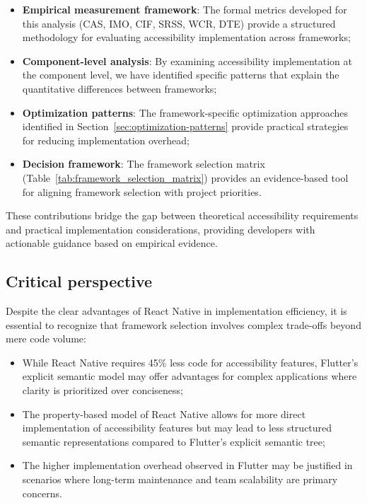 \begin{itemize}
    \item \textbf{Empirical measurement framework}: The formal metrics developed for this analysis (CAS, IMO, CIF, SRSS, WCR, DTE) provide a structured methodology for evaluating accessibility implementation across frameworks;

    \item \textbf{Component-level analysis}: By examining accessibility implementation at the component level, we have identified specific patterns that explain the quantitative differences between frameworks;

    \item \textbf{Optimization patterns}: The framework-specific optimization approaches identified in Section~\ref{sec:optimization-patterns} provide practical strategies for reducing implementation overhead;

    \item \textbf{Decision framework}: The framework selection matrix (Table~\ref{tab:framework_selection_matrix}) provides an evidence-based tool for aligning framework selection with project priorities.
\end{itemize}

These contributions bridge the gap between theoretical accessibility requirements and practical implementation considerations, providing developers with actionable guidance based on empirical evidence.

\subsection{Critical perspective}
\label{subsec:conclusion-critical}

Despite the clear advantages of React Native in implementation efficiency, it is essential to recognize that framework selection involves complex trade-offs beyond mere code volume:

\begin{itemize}
    \item While React Native requires 45\% less code for accessibility features, Flutter's explicit semantic model may offer advantages for complex applications where clarity is prioritized over conciseness;

    \item The property-based model of React Native allows for more direct implementation of accessibility features but may lead to less structured semantic representations compared to Flutter's explicit semantic tree;

    \item The higher implementation overhead observed in Flutter may be justified in scenarios where long-term maintenance and team scalability are primary concerns.
\end{itemize}

